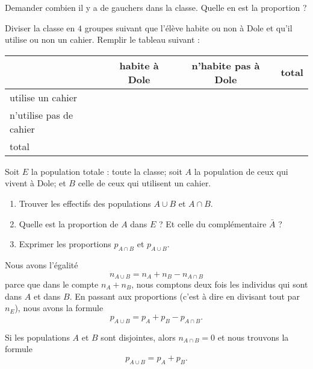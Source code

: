 \begin{example}
    Demander combien il y a de gauchers dans la classe. Quelle en est la proportion ?
\end{example}

\begin{example}
    Diviser la classe en \( 4\) groupes suivant que l'élève habite ou non à Dole et qu'il utilise ou non un cahier. Remplir le tableau suivant :

    \begin{center}
    \begin{tabular}{|l||c|c||c|}
        \hline\hline
        & habite à Dole&n'habite pas à Dole&total\\
        \hline
        utilise un cahier&&&\\
        \hline
        n'utilise pas de cahier&&&\\
        \hline\hline
        total&&&\\
        \hline
    \end{tabular}
    \end{center}

    Soit \( E\) la population totale : toute la classe; soit $A$ la population de ceux qui vivent à Dole; et \( B\) celle de ceux qui utilisent un cahier.
    \begin{enumerate}
        \item
            Trouver les effectifs des populations \( A\cup B\) et \( A\cap B\).
        \item
            Quelle est la proportion de \( A\) dans \( E\) ? Et celle du complémentaire \( \bar A\) ?
        \item
            Exprimer les proportions \( p_{A\cap B}\) et \( p_{A\cup B}\).
    \end{enumerate}
\end{example}

Nous avons l'égalité
\begin{equation}
    n_{A\cup B}=n_A+n_B-n_{A\cap B}
\end{equation}
parce que dans le compte \( n_A+n_B\), nous comptons deux fois les individus qui sont dans \( A\) et dans \( B\). En passant aux proportions (c'est à dire en divisant tout par \( n_E\)), nous avons la formule
\begin{equation}
    p_{A\cup B}=p_A+p_B-p_{A\cap B}.
\end{equation}

\begin{remark}
    Si les populations \( A\) et \( B\) sont disjointes, alors \( n_{A\cap B}=0\) et nous trouvons la formule
    \begin{equation}
        p_{A\cup B}=p_A+p_B.
    \end{equation}
\end{remark}

